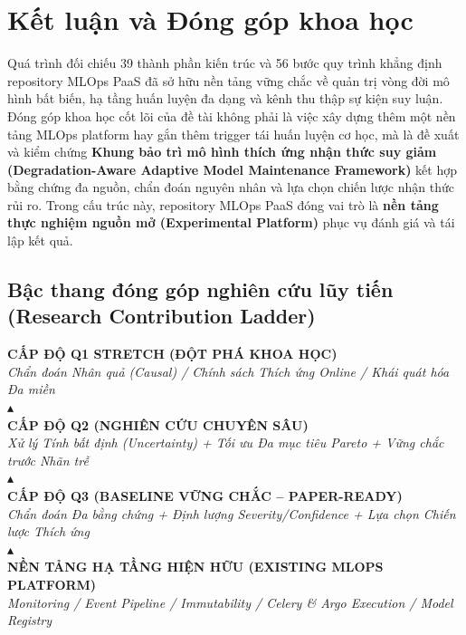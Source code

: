 \section{Kết luận và Đóng góp khoa học}

Quá trình đối chiếu 39 thành phần kiến trúc và 56 bước quy trình khẳng định repository MLOps PaaS đã sở hữu nền tảng vững chắc về quản trị vòng đời mô hình bất biến, hạ tầng huấn luyện đa dạng và kênh thu thập sự kiện suy luận. Đóng góp khoa học cốt lõi của đề tài không phải là việc xây dựng thêm một nền tảng MLOps platform hay gắn thêm trigger tái huấn luyện cơ học, mà là đề xuất và kiểm chứng \textbf{Khung bảo trì mô hình thích ứng nhận thức suy giảm (Degradation-Aware Adaptive Model Maintenance Framework)} kết hợp bằng chứng đa nguồn, chẩn đoán nguyên nhân và lựa chọn chiến lược nhận thức rủi ro. Trong cấu trúc này, repository MLOps PaaS đóng vai trò là \textbf{nền tảng thực nghiệm nguồn mở (Experimental Platform)} phục vụ đánh giá và tái lập kết quả.

\subsection{Bậc thang đóng góp nghiên cứu lũy tiến (Research Contribution Ladder)}

\begin{tcolorbox}[colback=blue!2!white,colframe=blue!40!black,arc=2pt,boxrule=0.6pt,top=4pt,bottom=4pt,left=6pt,right=6pt]
\centering\small
\textbf{CẤP ĐỘ Q1 STRETCH (ĐỘT PHÁ KHOA HỌC)}\\[0.1em]
\textit{Chẩn đoán Nhân quả (Causal) / Chính sách Thích ứng Online / Khái quát hóa Đa miền}\\[0.3em]
$\blacktriangle$\\[0.2em]
\textbf{CẤP ĐỘ Q2 (NGHIÊN CỨU CHUYÊN SÂU)}\\[0.1em]
\textit{Xử lý Tính bất định (Uncertainty) + Tối ưu Đa mục tiêu Pareto + Vững chắc trước Nhãn trễ}\\[0.3em]
$\blacktriangle$\\[0.2em]
\textbf{CẤP ĐỘ Q3 (BASELINE VỮNG CHẮC -- PAPER-READY)}\\[0.1em]
\textit{Chẩn đoán Đa bằng chứng + Định lượng Severity/Confidence + Lựa chọn Chiến lược Thích ứng}\\[0.3em]
$\blacktriangle$\\[0.2em]
\textbf{NỀN TẢNG HẠ TẦNG HIỆN HỮU (EXISTING MLOPS PLATFORM)}\\[0.1em]
\textit{Monitoring / Event Pipeline / Immutability / Celery \& Argo Execution / Model Registry}
\end{tcolorbox}

